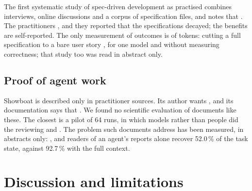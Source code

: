 The first systematic study of spec-driven development as practised combines
interviews, online discussions and a corpus of specification files, and notes
that .
The practitioners , and they reported that the
specifications decayed; the benefits are self-reported.
The only measurement of outcomes is of tokens: cutting a full specification to
a bare user story , for one model and without measuring correctness; that study too
was read in abstract only.

\subsection{Proof of agent work}

Showboat is described only in practitioner sources.
Its author wants , and its documentation says that
.
We found no scientific evaluation of documents like these.
The closest is a pilot of 64 runs, in which models rather than people did the
reviewing and .
The problem such documents address has been measured, in abstracts only:
, and readers of an agent's
reports alone recover 52.0\,\% of the task state, against 92.7\,\% with the
full context\autocite{xu2026ctxgap}.

\section{Discussion and limitations}
\label{sec:ai-rq4-discussion}

